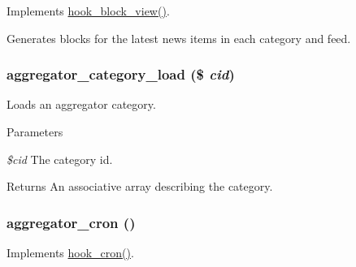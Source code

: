 \label{aggregator_8module_aad90d37427f960f03e64ff1ac7baade9}
Implements \hyperlink{group__hooks_gaa14092a3e74cdc57aa295100cfd6860d}{hook\_\-block\_\-view()}.

Generates blocks for the latest news items in each category and feed. \hypertarget{aggregator_8module_a21068362472c355d68eeeb37de326d91}{
\subsubsection[{aggregator\_\-category\_\-load}]{\setlength{\rightskip}{0pt plus 5cm}aggregator\_\-category\_\-load (\$ {\em cid})}}
\label{aggregator_8module_a21068362472c355d68eeeb37de326d91}
Loads an aggregator category.


\begin{DoxyParams}{Parameters}
\item[{\em \$cid}]The category id.\end{DoxyParams}
\begin{DoxyReturn}{Returns}
An associative array describing the category. 
\end{DoxyReturn}
\hypertarget{aggregator_8module_adbe7d09140773c5485cda52dd03bdab5}{
\subsubsection[{aggregator\_\-cron}]{\setlength{\rightskip}{0pt plus 5cm}aggregator\_\-cron ()}}
\label{aggregator_8module_adbe7d09140773c5485cda52dd03bdab5}
Implements \hyperlink{group__hooks_gaf07f1e3d98112fc2ba6920cf7ee6fb16}{hook\_\-cron()}.


